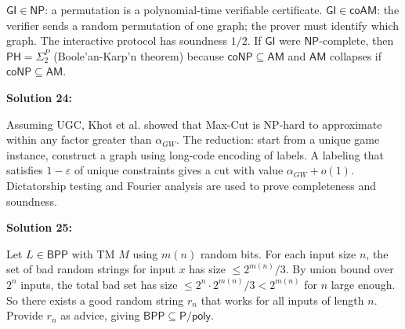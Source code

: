 \documentclass[12pt,a4paper]{exam}
\begin{document}
$\mathsf{GI} \in \mathsf{NP}$: a permutation is a polynomial-time verifiable certificate. $\mathsf{GI} \in \mathsf{coAM}$: the verifier sends a random permutation of one graph; the prover must identify which graph. The interactive protocol has soundness $1/2$. If $\mathsf{GI}$ were $\mathsf{NP}$-complete, then $\mathsf{PH} = \Sigma_2^P$ (Boole'an-Karp'n theorem) because $\mathsf{coNP} \subseteq \mathsf{AM}$ and $\mathsf{AM}$ collapses if $\mathsf{coNP} \subseteq \mathsf{AM}$.

\vspace{0.5cm}

\textbf{Solution 24:}

Assuming UGC, Khot et al. showed that Max-Cut is NP-hard to approximate within any factor greater than $\alpha_{GW}$. The reduction: start from a unique game instance, construct a graph using long-code encoding of labels. A labeling that satisfies $1-\varepsilon$ of unique constraints gives a cut with value $\alpha_{GW} + o(1)$. Dictatorship testing and Fourier analysis are used to prove completeness and soundness.

\vspace{0.5cm}

\textbf{Solution 25:}

Let $L \in \mathsf{BPP}$ with TM $M$ using $m(n)$ random bits. For each input size $n$, the set of bad random strings for input $x$ has size $\leq 2^{m(n)}/3$. By union bound over $2^n$ inputs, the total bad set has size $\leq 2^n \cdot 2^{m(n)}/3 < 2^{m(n)}$ for $n$ large enough. So there exists a good random string $r_n$ that works for all inputs of length $n$. Provide $r_n$ as advice, giving $\mathsf{BPP} \subseteq \mathsf{P}/\mathsf{poly}$.

\vspace{0.5cm}
\end{document}
